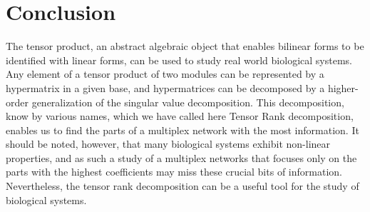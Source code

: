 \documentclass{report}
\theoremstyle{definition}
\theoremstyle{remark}
\begin{document}
\section{Conclusion}

The tensor product, an abstract algebraic object that enables bilinear forms to be identified with linear forms, can be used to study real world biological systems. Any element of a tensor product of two modules can be represented by a hypermatrix in a given base, and hypermatrices can be decomposed by a higher-order generalization of the singular value decomposition. This decomposition, know by various names, which we have called here Tensor Rank decomposition, enables us to find the parts of a multiplex network with the most information. It should be noted, however, that many biological systems exhibit non-linear properties, and as such a study of a multiplex networks that focuses only on the parts with the highest coefficients may miss these crucial bits of information. Nevertheless, the tensor rank decomposition can be a useful tool for the study of biological systems.












\printbibliography
\end{document}
